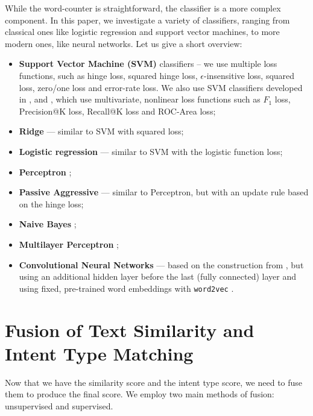 While the word-counter is straightforward, the classifier is a more complex component. In this paper, we investigate 
a variety of classifiers, ranging from classical ones like logistic regression and support vector machines, to more modern
ones, like neural networks. Let us give a short overview:

\begin{itemize}
 \item \textbf{Support Vector Machine (SVM)} classifiers --
we use multiple loss functions, such as hinge loss,
squared hinge loss, $\epsilon$-insensitive loss, squared loss, zero/one loss and error-rate loss. 
We also use SVM classifiers developed in \cite{svmperf1},
\cite{svmperf2} and \cite{svmperf3}, which use multivariate,
nonlinear loss functions such as $F_1$ loss, Precision@K loss, Recall@K loss and ROC-Area loss;
\item \textbf{Ridge} \cite{scikit} --- similar to SVM with squared loss;
\item \textbf{Logistic regression} \cite{scikit} --- similar to SVM with the logistic function loss;
\item \textbf{Perceptron} \cite{scikit};
\item \textbf{Passive Aggressive} \cite{passiveAggr} --- similar to Perceptron, but with an update rule
  based on the hinge loss;
\item \textbf{Naive Bayes} \cite{ir-intro};
\item \textbf{Multilayer Perceptron} \cite{scikit};
\item \textbf{Convolutional Neural Networks} --- based on the construction from \cite{cnn}, but using an additional
hidden layer before the last (fully connected) layer and using fixed, pre-trained word embeddings with \texttt{word2vec} \cite{w2v}.
\end{itemize}

\section{Fusion of Text Similarity and Intent Type Matching}
Now that we have the similarity score and the intent type score, we need to fuse them to produce the final score.
We employ two main methods of fusion: unsupervised and supervised.

